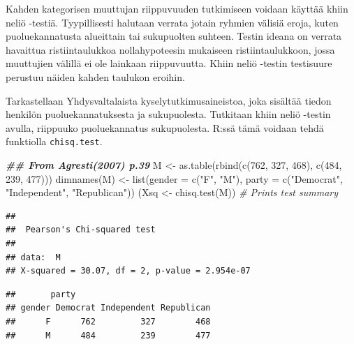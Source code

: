 \documentclass[
]{book}
\newenvironment{Shaded}{\begin{snugshade}}{\end{snugshade}}
\newcommand{\AttributeTok}[1]{\textcolor[rgb]{0.77,0.63,0.00}{#1}}
\newcommand{\CommentTok}[1]{\textcolor[rgb]{0.56,0.35,0.01}{\textit{#1}}}
\newcommand{\DecValTok}[1]{\textcolor[rgb]{0.00,0.00,0.81}{#1}}
\newcommand{\DocumentationTok}[1]{\textcolor[rgb]{0.56,0.35,0.01}{\textbf{\textit{#1}}}}
\newcommand{\FunctionTok}[1]{\textcolor[rgb]{0.00,0.00,0.00}{#1}}
\newcommand{\NormalTok}[1]{#1}
\newcommand{\OtherTok}[1]{\textcolor[rgb]{0.56,0.35,0.01}{#1}}
\newcommand{\SpecialCharTok}[1]{\textcolor[rgb]{0.00,0.00,0.00}{#1}}
\newcommand{\StringTok}[1]{\textcolor[rgb]{0.31,0.60,0.02}{#1}}
\begin{document}
Kahden kategorisen muuttujan riippuvuuden tutkimiseen voidaan käyttää khiin neliö -testiä. Tyypillisesti halutaan verrata jotain ryhmien välisiä eroja, kuten puoluekannatusta alueittain tai sukupuolten suhteen. Testin ideana on verrata havaittua ristiintaulukkoa nollahypoteesin mukaiseen ristiintaulukkoon, jossa muuttujien välillä ei ole lainkaan riippuvuutta. Khiin neliö -testin testisuure perustuu näiden kahden taulukon eroihin.

Tarkastellaan Yhdysvaltalaista kyselytutkimusaineistoa, joka sisältää tiedon henkilön puoluekannatuksesta ja sukupuolesta. Tutkitaan khiin neliö -testin avulla, riippuuko puoluekannatus sukupuolesta. R:ssä tämä voidaan tehdä funktiolla \texttt{chisq.test}.

\begin{Shaded}
\begin{Highlighting}[]
\DocumentationTok{\#\# From Agresti(2007) p.39}
\NormalTok{M }\OtherTok{\textless{}{-}} \FunctionTok{as.table}\NormalTok{(}\FunctionTok{rbind}\NormalTok{(}\FunctionTok{c}\NormalTok{(}\DecValTok{762}\NormalTok{, }\DecValTok{327}\NormalTok{, }\DecValTok{468}\NormalTok{), }\FunctionTok{c}\NormalTok{(}\DecValTok{484}\NormalTok{, }\DecValTok{239}\NormalTok{, }\DecValTok{477}\NormalTok{)))}
\FunctionTok{dimnames}\NormalTok{(M) }\OtherTok{\textless{}{-}} \FunctionTok{list}\NormalTok{(}\AttributeTok{gender =} \FunctionTok{c}\NormalTok{(}\StringTok{"F"}\NormalTok{, }\StringTok{"M"}\NormalTok{),}
                    \AttributeTok{party =} \FunctionTok{c}\NormalTok{(}\StringTok{"Democrat"}\NormalTok{, }\StringTok{"Independent"}\NormalTok{, }\StringTok{"Republican"}\NormalTok{))}
\NormalTok{(Xsq }\OtherTok{\textless{}{-}} \FunctionTok{chisq.test}\NormalTok{(M))  }\CommentTok{\# Prints test summary}
\end{Highlighting}
\end{Shaded}

\begin{verbatim}
## 
##  Pearson's Chi-squared test
## 
## data:  M
## X-squared = 30.07, df = 2, p-value = 2.954e-07
\end{verbatim}

\begin{Shaded}
\end{Shaded}

\begin{verbatim}
##       party
## gender Democrat Independent Republican
##      F      762         327        468
##      M      484         239        477
\end{verbatim}
\end{document}
